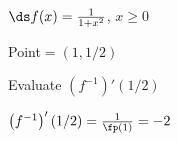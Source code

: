 {$\ds f(x) = \frac{1}{1+x^2}$, $x\geq 0$

Point$=(1,1/2)$ 

Evaluate $\left(f^{-1}\right)'(1/2)$}
{$\left(f^{-1}\right)'(1/2) = \frac{1}{\fp(1)} = -2$
}
